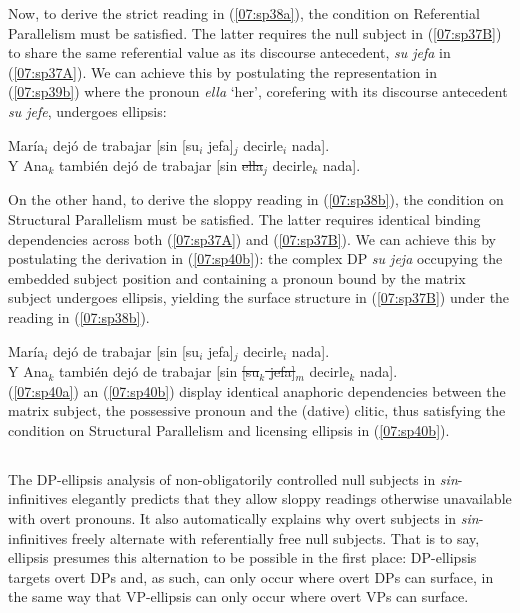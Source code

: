 \documentclass[output=paper,colorlinks,citecolor=brown,draft,draftmode]{langscibook}
\begin{document}
Now, to derive the strict reading in (\ref{07:sp38a}), the condition on Referential Parallelism must be satisfied. The latter requires the null subject in (\ref{07:sp37B}) to share the same referential value as its discourse antecedent, \textit{su jefa} in (\ref{07:sp37A}). We can achieve this by postulating the representation in (\ref{07:sp39b}) where the pronoun \textit{ella} ‘her’, corefering with its discourse antecedent \textit{su jefe}, undergoes ellipsis:

\ea\label{07:sp39}
\ea\label{07:sp39a}María$_i$ dejó de trabajar [sin [su$_i$ jefa]$_j$ decirle$_i$ nada].\\
\ex\label{07:sp39b}Y Ana$_k$ también dejó de trabajar [sin \st{ella$_j$} decirle$_k$ nada]. \\
\z
\z


On the other hand, to derive the sloppy reading in (\ref{07:sp38b}), the condition on Structural Parallelism must be satisfied. The latter requires identical binding dependencies across both (\ref{07:sp37A}) and (\ref{07:sp37B}). We can achieve this by postulating the derivation in (\ref{07:sp40b}): the complex DP \textit{su jeja} occupying the embedded subject  position and  containing a pronoun bound by the matrix subject undergoes ellipsis,  yielding the surface structure in (\ref{07:sp37B}) under the reading in (\ref{07:sp38b}).


\ea\label{07:sp40}
\ea\label{07:sp40a}María$_i$ dejó de trabajar [sin [su$_i$ jefa]$_j$ decirle$_i$ nada].\\
\ex\label{07:sp40b}Y Ana$_k$ también dejó de trabajar [sin \st{[su$_k$ jefa]$_m$} decirle$_k$ nada]. \\
\z
\z
(\ref{07:sp40a}) an (\ref{07:sp40b}) display identical anaphoric dependencies between the matrix subject, the possessive pronoun and the (dative) clitic, thus satisfying the condition on Structural Parallelism and licensing ellipsis in (\ref{07:sp40b}).

\subsection{}
The DP-ellipsis analysis of non-obligatorily controlled null subjects in \textit{sin}-in\-fin\-i\-tives elegantly predicts that they allow sloppy readings otherwise unavailable with overt pronouns. It also automatically explains why overt subjects in \textit{sin}-infinitives freely alternate with referentially free null subjects. That is to say, ellipsis presumes this alternation to be possible in the first place: DP-ellipsis targets overt DPs and, as such, can only occur where overt DPs can surface, in the same way that VP-ellipsis can only occur where overt VPs can surface.
\end{document}
